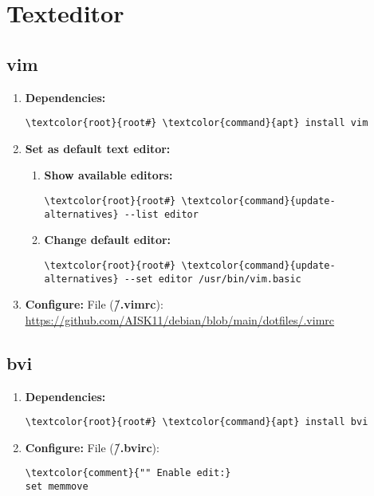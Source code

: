 \documentclass[10pt, a4paper, onecolumn, openany]{book} %
\begin{document}
\section{Texteditor}
\subsection{vim}
\begin{enumerate}
    \item \textbf{Dependencies:}
\begin{Verbatim}[commandchars=\\\{\}]
\textcolor{root}{root#} \textcolor{command}{apt} install vim
\end{Verbatim}
    \item \textbf{Set as default text editor:}
    \begin{enumerate}
        \item \textbf{Show available editors:}
        \begin{Verbatim}[commandchars=\\\{\}]
\textcolor{root}{root#} \textcolor{command}{update-alternatives} --list editor
\end{Verbatim}
        \item \textbf{Change default editor:}
\begin{Verbatim}[commandchars=\\\{\}]
\textcolor{root}{root#} \textcolor{command}{update-alternatives} --set editor /usr/bin/vim.basic
\end{Verbatim}
    \end{enumerate}
    \item \textbf{Configure:}
\newline File (\textbf{\textcolor{file}{\~/.vimrc}}):
\newline \underline{\url{https://github.com/AISK11/debian/blob/main/dotfiles/.vimrc}}
\end{enumerate}
\subsection{bvi}
\begin{enumerate}
    \item \textbf{Dependencies:}
\begin{Verbatim}[commandchars=\\\{\}]
\textcolor{root}{root#} \textcolor{command}{apt} install bvi
\end{Verbatim}
    \item \textbf{Configure:}
\newline File (\textbf{\textcolor{file}{\~/.bvirc}}):
\begin{Verbatim}[commandchars=\\\{\}]
\textcolor{comment}{"" Enable edit:}
set memmove
\end{Verbatim}
\end{enumerate}
\end{document}
